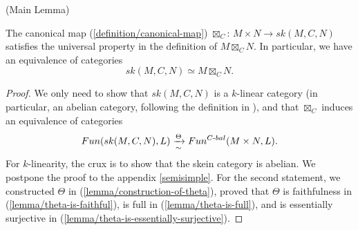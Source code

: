 \begin{lemma} (Main Lemma) \label{lemma/main-lemma}

  \noindent The canonical map (\ref{definition/canonical-map})
  $\boxtimes_{C}$: $M \times N \to sk(M,C,N)$ satisfies the universal property
  in the definition of $M \boxtimes_{C} N$. In particular, we have an
  equivalence of categories
  \[
    sk(M,C,N) \simeq M \boxtimes_{C} N.
  \]
\end{lemma}


\begin{proof}
  We only need to show that $sk(M,C,N)$ is a $k$-linear category (in
  particular, an abelian category, following the definition in
  \cite{douglas/balanced-product}), and that $\boxtimes_{C}$ induces an equivalence of
  categories
  \[
    Fun(sk(M,C,N), L) \xrightarrow[\sim]{\Theta} Fun^{C{\text -}bal}(M \times N, L).
  \]
  For $k$-linearity, the crux is to show that the skein category is abelian.
  We postpone the proof to the appendix \ref{semisimple}. For the second
  statement, we constructed $\Theta$ in (\ref{lemma/construction-of-theta}), proved that $\Theta$ is faithfulness in
  (\ref{lemma/theta-is-faithful}), is full in (\ref{lemma/theta-is-full}), and is essentially surjective in (\ref{lemma/theta-is-essentially-surjective}).
\end{proof}


